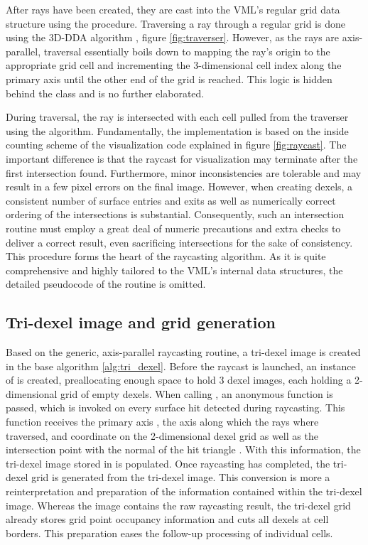 After rays have been created, they are cast into the VML's regular grid data structure using the  procedure.
Traversing a ray through a regular grid is done using the 3D-DDA algorithm \cite{3DDDA}, \cf figure \ref{fig:traverser}.
However, as the rays are axis-parallel, traversal essentially boils down to mapping the ray's origin to the appropriate grid cell and incrementing the 3-dimensional cell index along the primary axis until the other end of the grid is reached.
This logic is hidden behind the  class and is no further elaborated.

During traversal, the ray is intersected with each cell pulled from the traverser using the  algorithm.
Fundamentally, the implementation is based on the inside counting scheme of the visualization code explained in figure \ref{fig:raycast}.
The important difference is that the raycast for visualization may terminate after the first intersection found.
Furthermore, minor inconsistencies are tolerable and may result in a few pixel errors on the final image.
However, when creating dexels, a consistent number of surface entries and exits as well as numerically correct ordering of the intersections is substantial.
Consequently, such an intersection routine must employ a great deal of numeric precautions and extra checks to deliver a correct result, even sacrificing intersections for the sake of consistency.
This procedure forms the heart of the raycasting algorithm.
As it is quite comprehensive and highly tailored to the VML's internal data structures, the detailed pseudocode of the  routine is omitted.


\subsection{Tri-dexel image and grid generation}
\label{sec:tri_dexel_dexel_image_generation}

Based on the generic, axis-parallel raycasting routine, a tri-dexel image is created in the base algorithm \ref{alg:tri_dexel}.
Before the raycast is launched, an instance of  is created, preallocating enough space to hold 3 dexel images, each holding a 2-dimensional grid of empty dexels.
When calling , an anonymous function is passed, which is invoked on every surface hit detected during raycasting.
This function receives the primary axis , \ie the axis along which the rays where traversed,  and  coordinate on the 2-dimensional dexel grid as well as the intersection point  with the normal of the hit triangle .
With this information, the tri-dexel image stored in  is populated.
Once raycasting has completed, the tri-dexel grid is generated from the tri-dexel image.
This conversion is more a reinterpretation and preparation of the information contained within the tri-dexel image.
Whereas the image contains the raw raycasting result, the tri-dexel grid already stores grid point occupancy information and cuts all dexels at cell borders.
This preparation eases the follow-up processing of individual cells.

